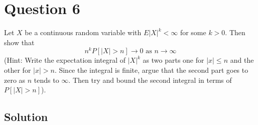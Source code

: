 \section*{Question 6}

Let \( X \) be a continuous random variable with \( E|X|^{k}<\infty \) for some \( k>0 \).
Then show that
\begin{equation*}
    n^{k} P[|X|>n] \rightarrow 0 \text { as } n \rightarrow \infty
\end{equation*}
(Hint: Write the expectation integral of \( |X|^{k} \) as two parts one for \( |x| \leq n \) and the other for \( |x|>n \).
Since the integral is finite, argue that the second part goes to zero as \( n \) tends to \( \infty \).
Then try and bound the second integral in terms of \( P[|X|>n] \)).

\subsection*{Solution}
